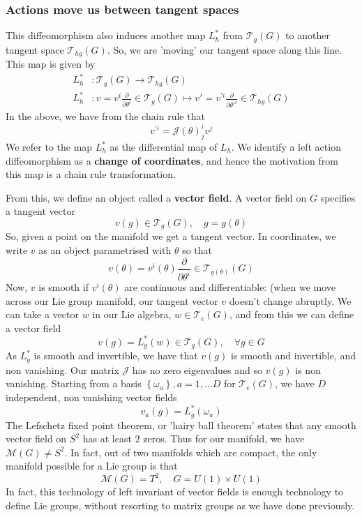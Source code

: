 \documentclass[11pt, oneside]{article}   	%
\theoremstyle{slanted}
\begin{document}
\subsubsection{Actions move us between tangent spaces} 
This diffeomorphism 
also induces another map $ L^ * _{ h } $ from $ \mathcal{ T }_ g ( G ) $
to another tangent space $ \mathcal{ T }_{ hg } ( G ) $. So, 
we are 'moving' our tangent space along this line. 
This map is given by 
\begin{align*}
	L^*_{ h } & : \mathcal{T }_ g ( G ) \to \mathcal{ T }_{hg } ( G ) \\
	L^*_{ h } & : v = v^{ i } \frac{\partial }{\partial \theta ^ i } \in \mathcal{ T }_ g ( G ) \mapsto v' = v^{ ' i } \frac{\partial }{\partial \theta'^{i } } \in \mathcal{ T }_{ hg }( G ) 
\end{align*} In the above, we have from the chain rule that 
\[
	v^{' i }  = \mathcal{ J }( \theta )^ i _j v ^ j 
\]  We refer to the map $ L_ h ^ * $ as the differential map of 
$ L _ h $. We identify a left action diffeomorphism 
as a \textbf{change of coordinates}, and hence 
the motivation from this map is a chain rule transformation. 


From this, we define an object called a \textbf{vector field}. 
A vector field on $ G $ specifies a tangent vector
\[
	v ( g) \in \mathcal{ T }_g ( G ) , \quad g = g( \theta ) 
\] So, given a point on the manifold we get a tangent vector. 
In coordinates, we write $ v $ as an object parametrised with $ \theta $ 
so that 
\[
	v ( \theta) = v ^ i ( \theta) \frac{\partial }{\partial \theta^ i} \in \mathcal{ T }_{ g ( \theta) }( G )  
\] Now, $ v  $ is smooth if $ v^ i ( \theta) $ are continuous and differentiable: 
(when we move across our Lie group manifold, our 
tangent vector $ v $ doesn't change abruptly. 
We can take a vector $w$ in our Lie algebra, $ w  \in \mathcal{ T }_ e( G ) $, 
and from this we can define a vector field 
\[
	v ( g ) = L^ *_g ( w ) \in \mathcal{ T }_ g ( G ), \quad \forall g \in G 
\] As $ L ^ * _ g $ is smooth and invertible, we 
have that $ v ( g ) $ is smooth and invertible, and non vanishing. Our matrix
$ \mathcal{ J }  $ has no zero eigenvalues and so $ v ( g ) $ is non vanishing. 
Starting from a basis  $ \left\{  \omega_ a  \right\} , a = 1 , \dots D $ for $ \mathcal{ T }_ e ( G ) $, 
we have $ D $ independent, non vanishing vector fields 
\[
 v_a ( g)  = L ^ * _ g ( \omega_ a ) 
\] The Lefschetz fixed point theorem, or 'hairy ball theorem' 
states that any smooth vector field on $ S^ 2 $ has at least $  2$ zeros. 
Thus for our manifold, we have $ \mathcal{ M } ( G ) \neq S^ 2 $. In fact, 
out of two manifolds which are compact, the only manifold possible for a 
Lie group is that 
\[
	\mathcal{ M } ( G )  = T ^2, \quad G = U ( 1) \times U ( 1) 
\] In fact, this technology of left invariant of vector fields 
is enough technology to define Lie groups, without resorting to matrix groups 
as we have done previously.
\end{document}

